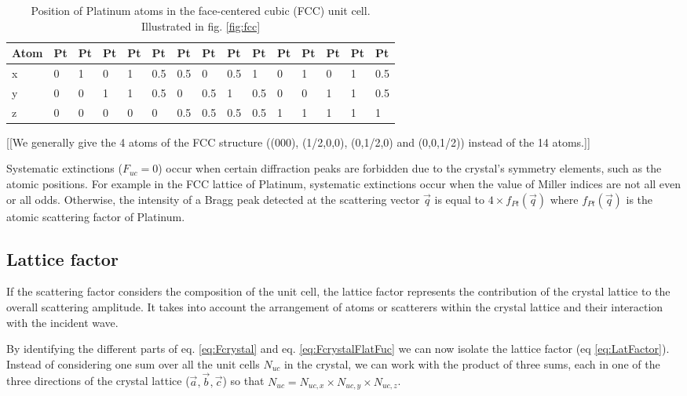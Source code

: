 \begin{table}[!htb]
    \centering
    \begin{tabular}{@{}lllllllllllllll@{}}
    \toprule
    Atom & Pt & Pt & Pt & Pt & Pt  & Pt  & Pt  & Pt  & Pt  & Pt & Pt & Pt & Pt & Pt  \\ \midrule
    x    & 0  & 1  & 0  & 1  & 0.5 & 0.5 & 0   & 0.5 & 1   & 0  & 1  & 0  & 1  & 0.5 \\
    y    & 0  & 0  & 1  & 1  & 0.5 & 0   & 0.5 & 1   & 0.5 & 0  & 0  & 1  & 1  & 0.5 \\
    z    & 0  & 0  & 0  & 0  & 0   & 0.5 & 0.5 & 0.5 & 0.5 & 1  & 1  & 1  & 1  & 1   \\ \bottomrule
    \end{tabular}
    \label{tab:PtAtoms}
    \caption{Position of Platinum atoms in the face-centered cubic (FCC) unit cell. Illustrated in fig. \ref{fig:fcc}}
\end{table}

{\color{DarkOrange}[[We generally give the 4 atoms of the FCC structure ((000), (1/2,0,0), (0,1/2,0) and (0,0,1/2)) instead of the 14 atoms.]]}

Systematic extinctions ($F_{uc} = 0$) occur when certain diffraction peaks are forbidden due to the crystal's symmetry elements, such as the atomic positions.
For example in the FCC lattice of Platinum, systematic extinctions occur when the value of Miller indices are not all even or all odds.
Otherwise, the intensity of a Bragg peak detected at the scattering vector $\vec{q}$ is equal to $4\times f_{Pt}(\vec{q})$ where $f_{Pt}(\vec{q})$ is the atomic scattering factor of Platinum.

\subsection{Lattice factor}

If the scattering factor considers the composition of the unit cell, the lattice factor represents the contribution of the crystal lattice to the overall scattering amplitude.
It takes into account the arrangement of atoms or scatterers within the crystal lattice and their interaction with the incident wave.

By identifying the different parts of eq. \ref{eq:Fcrystal} and eq. \ref{eq:FcrystalFlatFuc} we can now isolate the lattice factor (eq \ref{eq:LatFactor}).
Instead of considering one sum over all the unit cells $N_{uc}$ in the crystal, we can work with the product of three sums, each in one of the three directions of the crystal lattice ($\vec{a}, \vec{b}, \vec{c}$) so that $N_{uc} = N_{uc, x} \times N_{uc, y} \times N_{uc, z}$.


